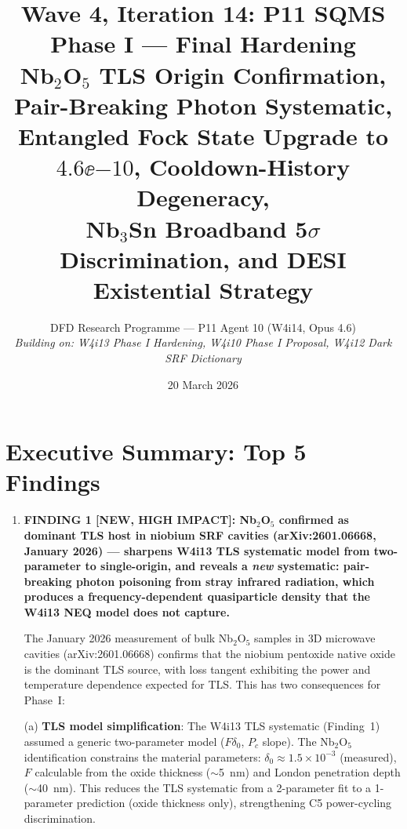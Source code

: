 \documentclass[11pt]{article}
\title{Wave 4, Iteration 14: P11 SQMS Phase I --- Final Hardening\\
\large Nb$_2$O$_5$ TLS Origin Confirmation, Pair-Breaking Photon Systematic,\\
Entangled Fock State Upgrade to $4.6\ee{-10}$, Cooldown-History Degeneracy,\\
Nb$_3$Sn Broadband 5$\sigma$ Discrimination, and DESI Existential Strategy}
\author{DFD Research Programme --- P11 Agent 10 (W4i14, Opus 4.6)\\
\textit{Building on: W4i13 Phase I Hardening, W4i10 Phase I Proposal,
W4i12 Dark SRF Dictionary}}
\date{20 March 2026}
\newcommand{\ee}[1]{\times 10^{#1}}
\theoremstyle{definition}
\theoremstyle{remark}
\begin{document}
\maketitle
\tableofcontents
\newpage

\section*{Executive Summary: Top 5 Findings}
\label{sec:top5}

\begin{tcolorbox}[colback=blue!5!white, colframe=blue!60!black,
  title=\textbf{W4i14 TOP 5 FINDINGS --- Ranked by Programme Impact}]
\begin{enumerate}

\item \textbf{FINDING 1 [NEW, HIGH IMPACT]: Nb$_2$O$_5$ confirmed as
dominant TLS host in niobium SRF cavities (arXiv:2601.06668, January 2026)
--- sharpens W4i13 TLS systematic model from two-parameter to
single-origin, and reveals a \emph{new} systematic: pair-breaking photon
poisoning from stray infrared radiation, which produces a
frequency-dependent quasiparticle density that the W4i13 NEQ model does
not capture.}

The January 2026 measurement of bulk Nb$_2$O$_5$ samples in 3D
microwave cavities (arXiv:2601.06668) confirms that the niobium
pentoxide native oxide is the dominant TLS source, with loss tangent
exhibiting the power and temperature dependence expected for TLS.
This has two consequences for Phase~I:

(a) \textbf{TLS model simplification}: The W4i13 TLS systematic
(Finding~1) assumed a generic two-parameter model ($F\delta_0$, $P_c$
slope). The Nb$_2$O$_5$ identification constrains the material
parameters: $\delta_0 \approx 1.5\ee{-3}$ (measured), $F$ calculable
from the oxide thickness ($\sim$5~nm) and London penetration depth
($\sim$40~nm). This reduces the TLS systematic from a 2-parameter
fit to a 1-parameter prediction (oxide thickness only), strengthening
C5 power-cycling discrimination.


\end{enumerate}
\end{tcolorbox}
\end{document}
